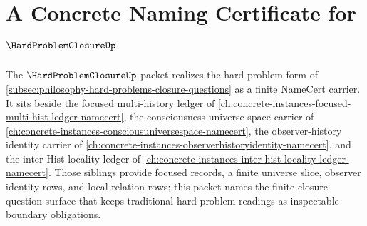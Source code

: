 \chapter{A Concrete Naming Certificate for $\HardProblemClosureUp$}
\label{ch:concrete-instances-hard-problem-closure-namecert}

The $\HardProblemClosureUp$ packet realizes the hard-problem form of \autoref{subsec:philosophy-hard-problems-closure-questions} as a finite NameCert carrier. It sits beside the focused multi-history ledger of \autoref{ch:concrete-instances-focused-multi-hist-ledger-namecert}, the consciousness-universe-space carrier of \autoref{ch:concrete-instances-consciousuniversespace-namecert}, the observer-history identity carrier of \autoref{ch:concrete-instances-observerhistoryidentity-namecert}, and the inter-Hist locality ledger of \autoref{ch:concrete-instances-inter-hist-locality-ledger-namecert}. Those siblings provide focused records, a finite universe slice, observer identity rows, and local relation rows; this packet names the finite closure-question surface that keeps traditional hard-problem readings as inspectable boundary obligations.

